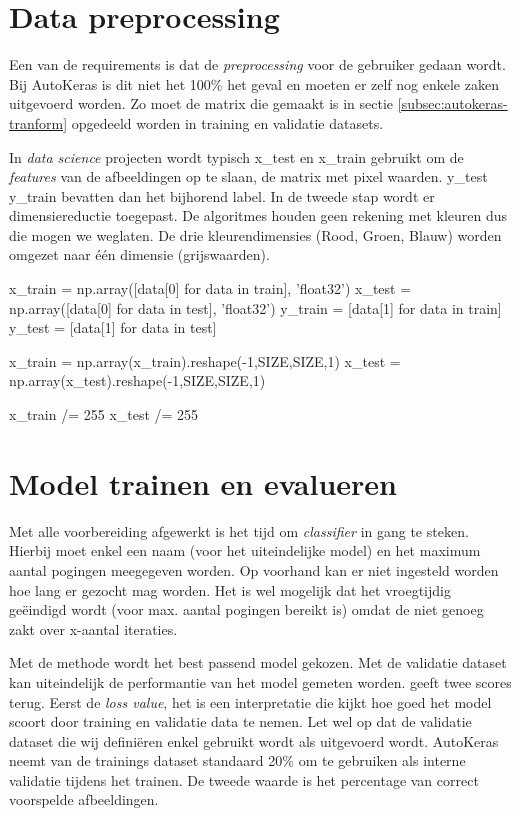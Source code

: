 \section{Data preprocessing}
\label{sec:preprocessing-autokeras}

Een van de requirements is dat de \textit{preprocessing} voor de gebruiker gedaan wordt. Bij AutoKeras is dit niet het 100\% het geval en moeten er zelf nog enkele zaken uitgevoerd worden. Zo moet de matrix die gemaakt is in sectie \ref{subsec:autokeras-tranform} opgedeeld worden in training en validatie datasets.

In \textit{data science} projecten wordt typisch x\_test en x\_train gebruikt om de \textit{features} van de afbeeldingen op te slaan, de matrix met pixel waarden. y\_test y\_train bevatten dan het bijhorend label. In de tweede stap wordt er dimensiereductie toegepast. De algoritmes houden geen rekening met kleuren dus die mogen we weglaten. De drie kleurendimensies (Rood, Groen, Blauw) worden omgezet naar één dimensie (grijswaarden).

\bigskip

\begin{python}
x_train = np.array([data[0] for data in train], 'float32')
x_test = np.array([data[0] for data in test], 'float32')
y_train = [data[1] for data in train]
y_test = [data[1] for data in test]

x_train = np.array(x_train).reshape(-1,SIZE,SIZE,1)
x_test = np.array(x_test).reshape(-1,SIZE,SIZE,1)

x_train /= 255
x_test /= 255
\end{python}

\section{Model trainen en evalueren}
\label{sec:traineval-autokeras}

Met alle voorbereiding afgewerkt is het tijd om \textit{classifier} in gang te steken. Hierbij moet enkel een naam (voor het uiteindelijke model) en het maximum aantal pogingen meegegeven worden. Op voorhand kan er niet ingesteld worden hoe lang er gezocht mag worden. Het is wel mogelijk dat het vroegtijdig geëindigd wordt (voor max. aantal pogingen bereikt is) omdat de  niet genoeg zakt over x-aantal iteraties.

Met de  methode wordt het best passend model gekozen. Met de validatie dataset kan uiteindelijk de performantie van het model gemeten worden.  geeft twee scores terug. Eerst de \textit{loss value}, het is een interpretatie die kijkt hoe goed het model scoort door training en validatie data te nemen. Let wel op dat de validatie dataset die wij definiëren enkel gebruikt wordt als  uitgevoerd wordt. AutoKeras neemt van de trainings dataset standaard 20\% om te gebruiken als interne validatie tijdens het trainen. De tweede waarde is het percentage van correct voorspelde afbeeldingen.

